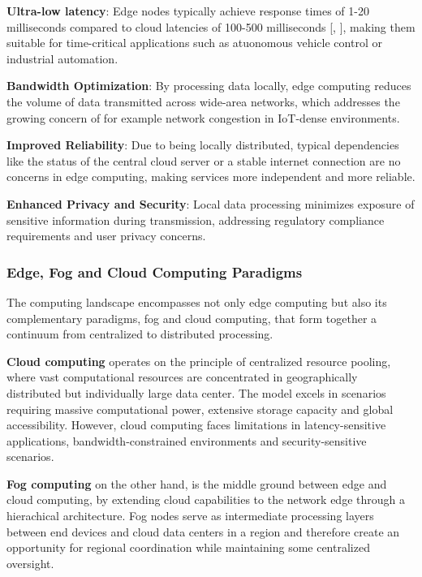 \textbf{Ultra-low latency}: Edge nodes typically achieve response times of 1-20 milliseconds compared to cloud latencies of 100-500 milliseconds [\cite{8215403}, \cite{1019408}], making them suitable for time-critical applications such as atuonomous vehicle control or industrial automation.

\textbf{Bandwidth Optimization}: By processing data locally, edge computing reduces the volume of data transmitted across wide-area networks, which addresses the growing concern of for example network congestion in IoT-dense environments.

\textbf{Improved Reliability}: Due to being locally distributed, typical dependencies like the status of the central cloud server or a stable internet connection are no concerns in edge computing, making services more independent and more reliable.

\textbf{Enhanced Privacy and Security}: Local data processing minimizes exposure of sensitive information during transmission, addressing regulatory compliance requirements and user privacy concerns.

\subsubsection{Edge, Fog and Cloud Computing Paradigms}
The computing landscape encompasses not only edge computing but also its complementary paradigms, fog and cloud computing, that form together a continuum from centralized to distributed processing.

\textbf{Cloud computing} operates on the principle of centralized resource pooling, where vast computational resources are concentrated in geographically distributed but individually large data center.
The model excels in scenarios requiring massive computational power, extensive storage capacity and global accessibility.
However, cloud computing faces limitations in latency-sensitive applications, bandwidth-constrained environments and security-sensitive scenarios.

\textbf{Fog computing} on the other hand, is the middle ground between edge and cloud computing, by extending cloud capabilities to the network edge through a hierachical architecture.
Fog nodes serve as intermediate processing layers between end devices and cloud data centers in a region and therefore create an opportunity for regional coordination while maintaining some centralized oversight.

